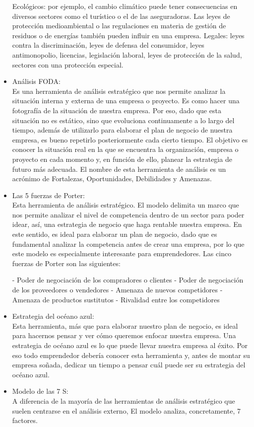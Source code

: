 \documentclass[%
 reprint,
 amsmath,amssymb,
 aps,
]{revtex4-1}
\begin{document}
\begin{itemize}
Ecológicos: por ejemplo, el cambio climático puede tener consecuencias en diversos sectores como el turístico o el de las aseguradoras. Las leyes de protección medioambiental o las regulaciones en materia de gestión de residuos o de energías también pueden influir en una empresa.
Legales: leyes contra la discriminación, leyes de defensa del consumidor, leyes antimonopolio, licencias, legislación laboral, leyes de protección de la salud, sectores con una protección especial.
\item Análisis FODA:
\\Es una herramienta de análisis estratégico que nos permite analizar la situación interna y externa de una empresa o proyecto. Es como hacer una fotografía de la situación de nuestra empresa. Por eso, dado que esta situación no es estático, sino que evoluciona continuamente a lo largo del tiempo, además de utilizarlo para elaborar el plan de negocio de nuestra empresa, es bueno repetirlo posteriormente cada cierto tiempo. El objetivo es conocer la situación real en la que se encuentra la organización, empresa o proyecto en cada momento y, en función de ello, planear la estrategia de futuro más adecuada. El nombre de esta herramienta de análisis es un acrónimo de Fortalezas, Oportunidades, Debilidades y Amenazas. 

\item Las 5 fuerzas de Porter:\\
Esta herramienta de análisis estratégico. El modelo delimita un marco que nos permite analizar el nivel de competencia dentro de un sector para poder idear, así, una estrategia de negocio que haga rentable nuestra empresa. En este sentido, es ideal para elaborar un plan de negocio, dado que es fundamental analizar la competencia antes de crear una empresa, por lo que este modelo es especialmente interesante para emprendedores. Las cinco fuerzas de Porter son las siguientes:

- Poder de negociación de los compradores o clientes
- Poder de negociación de los proveedores o vendedores
- Amenaza de nuevos competidores
- Amenaza de productos sustitutos
- Rivalidad entre los competidores

\item Estrategia del océano azul:\\
Esta herramienta, más que para elaborar nuestro plan de negocio, es ideal para hacernos pensar y ver cómo queremos enfocar nuestra empresa. Una estrategia de océano azul es lo que puede llevar nuestra empresa al éxito. Por eso todo emprendedor debería conocer esta herramienta y, antes de montar su empresa soñada, dedicar un tiempo a pensar cuál puede ser su estrategia del océano azul.	
\item Modelo de las 7 S:
\\A diferencia de la mayoría de las herramientas de análisis estratégico que suelen centrarse en el análisis externo, El modelo analiza, concretamente, 7 factores.


\end{itemize}
\end{document}
